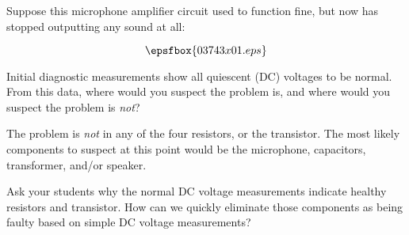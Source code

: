 

Suppose this microphone amplifier circuit used to function fine, but now has stopped outputting any sound at all:

$$\epsfbox{03743x01.eps}$$

Initial diagnostic measurements show all quiescent (DC) voltages to be normal.  From this data, where would you suspect the problem is, and where would you suspect the problem is {\it not}?







The problem is {\it not} in any of the four resistors, or the transistor.  The most likely components to suspect at this point would be the microphone, capacitors, transformer, and/or speaker.







Ask your students why the normal DC voltage measurements indicate healthy resistors and transistor.  How can we quickly eliminate those components as being faulty based on simple DC voltage measurements?




